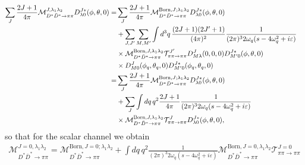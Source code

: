 \documentclass[aps,prd,preprintnumbers,showpacs,showkeys,nofootinbib,
superscriptaddress,fleqn,floatfix,tightenlines, 10pt]{revtex4-1}
\begin{document}
\begin{align} \label{BbS2}
\sum_J {\frac{2J+1}{4\pi}\mathcal{M}_{D^* \bar{D}^* \rightarrow \pi\pi} ^
{J, \lambda_1 \lambda_2} D^{J*}_{\lambda 0} (\phi, \theta, 0)}
= &\sum_J {\frac{2J+1}{4\pi} \mathcal{M}_{D^* \bar{D}^* \rightarrow \pi\pi}
^{\mathrm{Born}, J ; \lambda_1 \lambda_2}} D^{J*}_{\lambda 0} (\phi, \theta, 0) \cr
&+ \sum_{J,J'} \sum_{M,M'} {\int{d^3q\, \frac{(2J+1)(2J'+1)}{(4\pi)^2}
\frac{1}{(2\pi)^3 2\omega_q (s - 4\omega_q^2 + i \varepsilon)}}}
\cr &\times
\mathcal{M}_{D^* \bar{D}^* \rightarrow \pi\pi}^{\mathrm{Born},J, \lambda_1 \lambda_2}
\mathcal{T}_{\pi\pi \rightarrow \pi\pi}^{J'}
 D^{J}_{M \lambda} (0,0,0) D^{J*}_{M' 0} (\phi, \theta, 0) \cr
&\times D^J_{M 0} (\phi_q, \theta_q, 0) D^{J*}_{M'0} (\phi_q, \theta_q, 0) \cr
= &\sum_J \frac{2J+1}{4\pi} \mathcal{M}_{D^* \bar{D}^* \rightarrow \pi\pi}
^{\mathrm{Born},J;\lambda_1 \lambda_2} D^{J*}_{\lambda 0} (\phi, \theta, 0) \cr
& + \sum_J \int{dq\, q^2 \frac{2J+1}{4\pi}
\frac{1}{(2\pi)^3 2\omega_q (s - 4\omega_q^2 + i \varepsilon)}} \cr
& \times \mathcal{M}_{D^* \bar{D}^* \rightarrow \pi\pi}^{\mathrm{Born},J, \lambda_1 \lambda_2}
\mathcal{T}_{\pi\pi \rightarrow \pi\pi}^{J} D^{J*}_{\lambda 0} (\phi, \theta, 0),
\end{align}
so that for the scalar channel we obtain
\begin{align}
\mathcal{M}_{D^* \bar{D}^* \rightarrow \pi\pi}^{J=0, \lambda_1 \lambda_2}
= \mathcal{M}_{D^* \bar{D}^* \rightarrow \pi\pi}^
{\mathrm{Born},J=0; \lambda_1 \lambda_2} +
\int{dq\, q^2 \frac{1}{(2\pi)^3 2\omega_q (s - 4\omega_q^2 + i \varepsilon)}}
\mathcal{M}_{D^* \bar{D}^* \rightarrow \pi\pi}^{\mathrm{Born},J=0, \lambda_1 \lambda_2}
\mathcal{T}_{\pi\pi \rightarrow \pi\pi}^{J=0}
\end{align}
\end{document}
